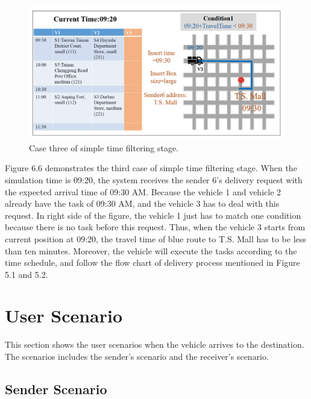 \documentclass[12pt]{ksthesis}
\begin{document}
\begin{thesis}
{\begin{figure}[H]
\centering
\includegraphics[width=1.0\textwidth]{./Thesis_figures/F6-6_caseThree_SchedulingStage.PNG}
\caption{\large Case three of simple time filtering stage.}
\vspace{0.5cm}
\label{Fig:CaseThree_TimeFiltering}
\end{figure}

Figure 6.6 demonstrates the third case of simple time filtering stage. When the simulation time is 09:20, the system receives the sender 6’s delivery request with the expected arrival time of 09:30 AM. Because the vehicle 1 and vehicle 2 already have the task of 09:30 AM, and the vehicle 3 has to deal with this request. In right side of the figure, the vehicle 1 just has to match one condition because there is no task before this request. Thus, when the vehicle 3 starts from current position at 09:20, the travel time of blue route to T.S. Mall has to be less than ten minutes.
Moreover, the vehicle will execute the tasks according to the time schedule, and follow the flow chart of delivery process mentioned in Figure 5.1 and 5.2.


\section{User Scenario}

This section shows the user scenarios when the vehicle arrives to the destination. The scenarios includes the sender's scenario and the receiver's scenario.

\subsection{Sender Scenario}

}
\end{thesis}
\end{document}
